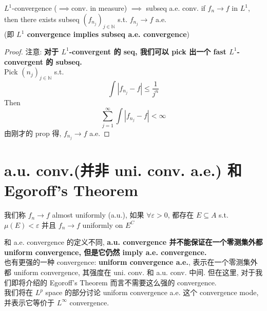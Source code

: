 \documentclass[lang=cn,11pt]{elegantbook}
\begin{document}
\begin{corollary}{$L^1$-convergence ($\implies$conv. in measure) $\implies$ subseq a.e. conv. }
    if $f_n \rightarrow f$ in $L^1$, then there exists subseq $(f_{n_j})_{j\in \mathbb{N}}$ s.t. $f_{n_j} \rightarrow f$ a.e. \\
    (即 \textbf{$L^1$ convergence implies subseq a.e. convergence})
\end{corollary}
\begin{proof}
    注意: \textbf{对于 $L^1$-convergent 的 seq, 我们可以 pick 出一个 fast $L^1$-convergent 的 subseq.}\\
    Pick $(n_j)_{j\in\mathbb{N}}$ s.t. 
    \[
    \int |f_{n_j} - f| \leq \frac{1}{j^n}
    \]
    Then \[
    \sum_{j=1}^\infty \int |f_{n_j}-f| < \infty
    \]
    由刚才的 prop 得, $f_{n_j}\rightarrow f$ a.e.
\end{proof}

\section{a.u. conv.(并非 uni. conv. a.e.) 和 Egoroff's Theorem}
\begin{definition}
    我们称 $f_n\rightarrow f$ almost uniformly (a.u.), 如果 $\forall \varepsilon > 0$, 都存在 $E \subseteq A$ s.t. $\mu(E) < \varepsilon$ 并且 $f_n \rightarrow f$ uniformly on $E^C$
\end{definition}
\begin{remark}
    和 a.e. convergence 的定义不同, \textbf{a.u. convergence 并不能保证在一个零测集外都 uniform convergence, 但是它仍然 imply a.e. convergence.}\\
    也有更强的一种 convergence: \textbf{uniform convergence a.e.}, 表示在一个零测集外都 uniform convergence, 其强度在 uni. conv. 和 a.u. conv. 中间. 但在这里, 对于我们即将介绍的 Egoroff's Theorem 而言不需要这么强的 convergence. \\
    我们将在 $L^p$ space 的部分讨论 uniform convergence a.e. 这个 convergence mode, 并表示它等价于 $L^\infty$ convergence.
\end{remark}
\end{document}
